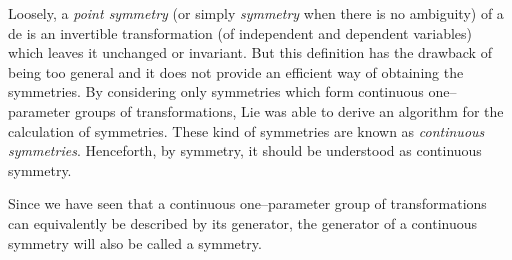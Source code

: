 Loosely, a {\em point symmetry} (or simply {\em symmetry} when there is no
ambiguity) of a de is an invertible
transformation (of independent and dependent variables)
which leaves it unchanged or invariant. But this definition has the drawback
of being too general and it does not provide an efficient way of obtaining
the symmetries. By considering only symmetries which form
continuous one--parameter groups of
transformations, Lie was able to derive an algorithm for
the calculation of symmetries. These kind of symmetries are known as {\em
continuous symmetries}. Henceforth, by symmetry, it should be understood
as continuous symmetry.

Since we have seen that a continuous one--parameter
group of transformations can equivalently be described by its generator, the
generator of a continuous symmetry will also be called a symmetry.

